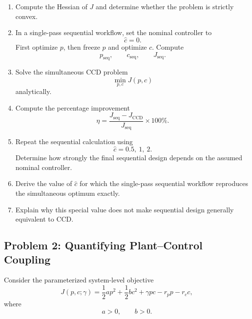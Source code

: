\begin{enumerate}
    \item Compute the Hessian of $J$ and determine whether the problem is
    strictly convex.

    \item In a single-pass sequential workflow, set the nominal controller
    to
    \begin{equation}
    \hat{c}=0.
    \end{equation}
    First optimize $p$, then freeze $p$ and optimize $c$. Compute
    \begin{equation}
    p_{\mathrm{seq}},
    \qquad
    c_{\mathrm{seq}},
    \qquad
    J_{\mathrm{seq}}.
    \end{equation}

    \item Solve the simultaneous CCD problem
    \begin{equation}
    \min_{p,c}J(p,c)
    \end{equation}
    analytically.

    \item Compute the percentage improvement
    \begin{equation}
    \eta
    =
    \frac{
    J_{\mathrm{seq}}-J_{\mathrm{CCD}}
    }{
    J_{\mathrm{seq}}
    }
    \times100\%.
    \end{equation}

    \item Repeat the sequential calculation using
    \begin{equation}
    \hat{c}=0.5,\ 1,\ 2.
    \end{equation}
    Determine how strongly the final sequential design depends on the
    assumed nominal controller.

    \item Derive the value of $\hat{c}$ for which the single-pass sequential
    workflow reproduces the simultaneous optimum exactly.

    \item Explain why this special value does not make sequential design
    generally equivalent to CCD.
\end{enumerate}


\subsection*{Problem 2: Quantifying Plant--Control Coupling}

Consider the parameterized system-level objective
\begin{equation}
J(p,c;\gamma)
=
\frac{1}{2}a p^2
+
\frac{1}{2}b c^2
+
\gamma pc
-
r_p p
-
r_c c,
\end{equation}
where
\begin{equation}
a>0,
\qquad
b>0.
\end{equation}

